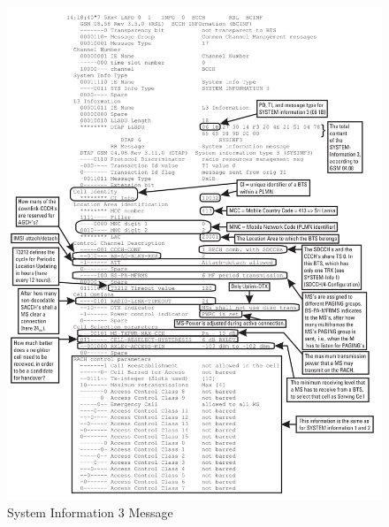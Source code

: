 \begin{figure}
\centering
\includegraphics[width=.9\textwidth]{../Images/sysinfo3}
\caption{System Information 3 Message}
\end{figure}
